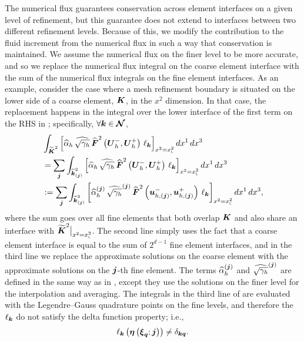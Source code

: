 The numerical flux guarantees conservation across element interfaces on a
given level of refinement, but this guarantee does not extend to interfaces
between two different refinement levels.
Because of this, we modify the contribution to the fluid increment
from the numerical flux in such a way that conservation is maintained.
We assume the numerical flux on the finer level to be more accurate,
and so we replace the numerical flux integral on the coarse element interface
with the sum of the numerical flux integrals on the fine element interfaces.
As an example, consider the case where a mesh refinement boundary is situated
on the lower side of a coarse element, $\boldsymbol{K}$, in the $x^{2}$ dimension.
In that case, the replacement happens in the integral over the lower interface
of the first term on the RHS in ;
specifically, $\forall\boldsymbol{k}\in\boldsymbol{\mathcal{N}}$,
\begin{align}
\begin{split}
  &\int_{\widetilde{\boldsymbol{K}}^{2}}
  \left[\widehat{\alpha}_{h}\,\widehat{\sqrt{\gamma_{h}}}\,
  \widehat{\boldsymbol{F}}^{2}\left(\boldsymbol{U}_{h}^{-},\boldsymbol{U}_{h}^{+}\right)\,
  \ell_{\boldsymbol{k}}
  \right]_{x^{2}=x^{2}_{\textsc{l}}}
  dx^{1}\,dx^{3}\\
  &=\sum\limits_{\boldsymbol{j}}
  \int_{\widetilde{\boldsymbol{k}}^{2}_{\left(\boldsymbol{j}\right)}}
  \left[\widehat{\alpha}_{h}\,\widehat{\sqrt{\gamma_{h}}}\,
  \widehat{\boldsymbol{F}}^{2}\left(\boldsymbol{U}_{h}^{-},\boldsymbol{U}_{h}^{+}\right)\,
  \ell_{\boldsymbol{k}}
  \right]_{x^{2}=x^{2}_{\textsc{l}}}
  dx^{1}\,dx^{3}\\
  &:=\sum\limits_{\boldsymbol{j}}
  \int_{\widetilde{\boldsymbol{k}}^{2}_{\left(\boldsymbol{j}\right)}}
  \left[\widehat{\alpha}^{\left(\boldsymbol{j}\right)}_{h}\,
  \widehat{\sqrt{\gamma_{h}}}^{\left(\boldsymbol{j}\right)}\,
  \widehat{\boldsymbol{F}}^{2}
  \left(\boldsymbol{u}_{h,\left(\boldsymbol{j}\right)}^{-},
  \boldsymbol{u}_{h,\left(\boldsymbol{j}\right)}^{+}\right)\,
  \ell_{\boldsymbol{k}}
  \right]_{x^{2}=x^{2}_{\textsc{l}}}
  dx^{1}\,dx^{3},
\end{split}
\label{eq.fluxCorrection}
\end{align}
where the sum goes over all fine elements that both overlap $\boldsymbol{K}$ and
also share an interface with $\widetilde{\boldsymbol{K}}^{2}\big|_{x^{2}=x^{2}_{\textsc{l}}}$.
The second line simply uses the fact that a coarse element interface
is equal to the sum of $2^{d-1}$ fine element interfaces,
and in the third line we replace the approximate solutions on the coarse
element with the approximate solutions on the $\boldsymbol{j}$-th fine element.
The terms $\widehat{\alpha}_{h}^{\left(\boldsymbol{j}\right)}$ and
$\widehat{\sqrt{\gamma_{h}}}^{\left(\boldsymbol{j}\right)}$ are defined in the same way
as in , except they use the solutions on
the finer level for the interpolation and averaging.
The integrals in the third line of  are
evaluated with the Legendre--Gauss quadrature points on the fine
levels, and therefore the $\ell_{\boldsymbol{k}}$ do not
satisfy the delta function property; i.e.,
\begin{equation}
  \ell_{\boldsymbol{k}}\left(\boldsymbol{\eta}\left(\boldsymbol{\xi}_{\boldsymbol{q}};\boldsymbol{j}\right)\right)
  \neq\delta_{\boldsymbol{k}\boldsymbol{q}}.
\end{equation}

